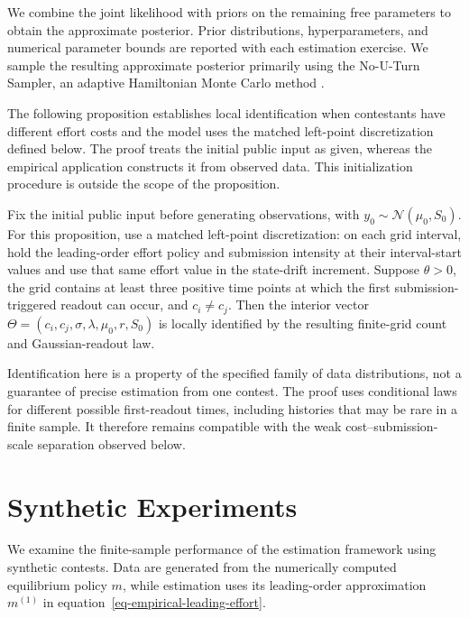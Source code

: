 \documentclass[mnsc]{informs3}
\begin{document}
We combine the joint likelihood with priors on the remaining free parameters to obtain the approximate posterior. Prior distributions, hyperparameters, and numerical parameter bounds are reported with each estimation exercise.
We sample the resulting approximate posterior primarily using the No-U-Turn Sampler, an adaptive Hamiltonian Monte Carlo method \citep{hoffman2014NUTS}.

{\color{black}The following proposition establishes local identification when contestants have different effort costs and the model uses the matched left-point discretization defined below. The proof treats the initial public input as given, whereas the empirical application constructs it from observed data. This initialization procedure is outside the scope of the proposition.}

\begin{proposition}\label{prop-local-identification}
{Fix the initial public input before generating observations, with $y_0\sim\mathcal N(\mu_0,S_0)$. For this proposition, use a matched left-point discretization: on each grid interval, hold the leading-order effort policy and submission intensity at their interval-start values and use that same effort value in the state-drift increment. Suppose $\theta>0$, {\color{black}the grid contains at least three positive time points at which the first submission-triggered readout can occur}, and $c_i\ne c_j$. Then the interior vector $\Theta=(c_i,c_j,\sigma,\lambda,\mu_0,r,S_0)$ is {\color{black}locally identified} by the resulting finite-grid count and Gaussian-readout law.}
\end{proposition}

\begingroup
Identification here is a property of the specified family of data distributions, not a guarantee of precise estimation from one contest. The proof uses conditional laws for different possible first-readout times, including histories that may be rare in a finite sample. It therefore remains compatible with the weak cost--submission-scale separation observed below.
\par\endgroup

\section{Synthetic Experiments}\label{sect-synthetic}

{We examine the finite-sample performance of the estimation framework using synthetic contests. Data are generated from the numerically computed equilibrium policy $m$, while estimation uses its leading-order approximation $m^{(1)}$ in equation~\eqref{eq-empirical-leading-effort}.}
\end{document}
